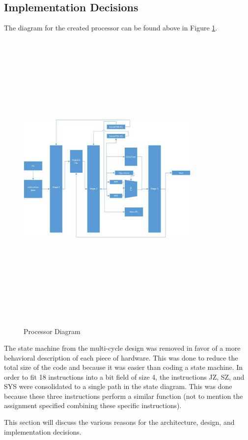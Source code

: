 \documentclass[conference]{IEEEtran}
\begin{document}
\subsection{Implementation Decisions}
The diagram for the created processor can be found above in Figure \ref{fig:procDiagram}.
\begin{figure}
  \caption{Processor Diagram}
  \centering
    \includegraphics[width = 9cm, height=15cm,keepaspectratio]{proc.jpg}
  \label{fig:procDiagram}
\end{figure}

The state machine from the multi-cycle design was removed in favor of a more behavioral description of each piece of hardware.
This was done to reduce the total size of the code and because it was easier than coding a state machine.
In order to fit 18 instructions into a bit field of size 4, the instructions JZ, SZ, and SYS were consolidated to a single path in the state diagram.
This was done because these three instructions perform a similar function (not to mention the assignment specified combining these specific instructions).


This section will discuss the various reasons for the architecture, design, and implementation decisions.
\end{document}
